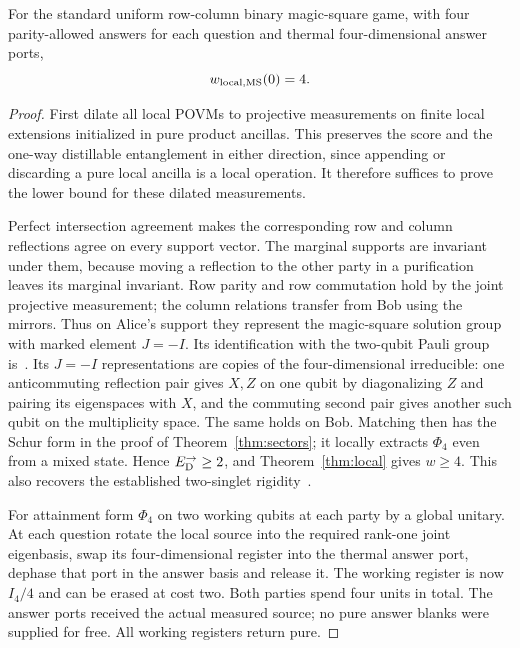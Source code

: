 \begin{theorem}\label{thm:magic}
For the standard uniform row-column binary magic-square game, with four parity-allowed answers for each question and thermal four-dimensional answer ports,
\[
 w_{\rm local,MS}(0)=4.
\]
\end{theorem}
\begin{proof}
First dilate all local POVMs to projective measurements on finite local extensions initialized in pure product ancillas. This preserves the score and the one-way distillable entanglement in either direction, since appending or discarding a pure local ancilla is a local operation. It therefore suffices to prove the lower bound for these dilated measurements.

Perfect intersection agreement makes the corresponding row and column reflections agree on every support vector. The marginal supports are invariant under them, because moving a reflection to the other party in a purification leaves its marginal invariant. Row parity and row commutation hold by the joint projective measurement; the column relations transfer from Bob using the mirrors. Thus on Alice's support they represent the magic-square solution group with marked element $J=-I$. Its identification with the two-qubit Pauli group is~\cite[Proposition 6.10]{cs}. Its $J=-I$ representations are copies of the four-dimensional irreducible: one anticommuting reflection pair gives $X,Z$ on one qubit by diagonalizing $Z$ and pairing its eigenspaces with $X$, and the commuting second pair gives another such qubit on the multiplicity space. The same holds on Bob. Matching then has the Schur form in the proof of Theorem~\ref{thm:sectors}; it locally extracts $\Phi_4$ even from a mixed state. Hence $E_{\mathrm D}^{\to}\ge2$, and Theorem~\ref{thm:local} gives $w\ge4$. This also recovers the established two-singlet rigidity~\cite[Appendix C, Lemma C.1 and its application]{wu}.

For attainment form $\Phi_4$ on two working qubits at each party by a global unitary. At each question rotate the local source into the required rank-one joint eigenbasis, swap its four-dimensional register into the thermal answer port, dephase that port in the answer basis and release it. The working register is now $I_4/4$ and can be erased at cost two. Both parties spend four units in total. The answer ports received the actual measured source; no pure answer blanks were supplied for free. All working registers return pure.
\end{proof}

